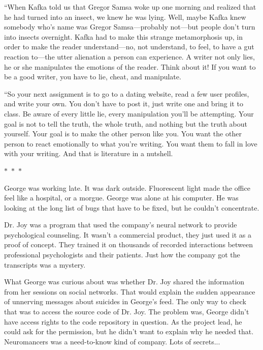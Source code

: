 \documentclass{memoir}
\newcommand{\starbreak}{%
\begin{center}
  $\ast$~$\ast$~$\ast$
\end{center}
}
\begin{document}
``When Kafka told us that Gregor Samsa woke up one morning and realized that he had turned into an insect, we knew he was lying. Well, maybe Kafka knew somebody who's name was Gregor Samsa---probably not---but people don't turn into insects overnight. Kafka had to make this strange metamorphosis up, in order to make the reader understand---no, not understand, to feel, to have a gut reaction to---the utter alienation a person can experience. A writer not only lies, he or she manipulates the emotions of the reader. Think about it! If you want to be a good writer, you have to lie, cheat, and manipulate.

``So your next assignment is to go to a dating website, read a few user profiles, and write your own. You don't have to post it, just write one and bring it to class. Be aware of every little lie, every manipulation you'll be attempting. Your goal is not to tell the truth, the whole truth, and nothing but the truth about yourself. Your goal is to make the other person like you. You want the other person to react emotionally to what you're writing. You want them to fall in love with your writing. And that is literature in a nutshell. 

\starbreak

George was working late. It was dark outside. Fluorescent light made the office feel like a hospital, or a morgue. George was alone at his computer. He was looking at the long list of bugs that have to be fixed, but he couldn't concentrate. 

Dr. Joy was a program that used the company's neural network to provide psychological counseling. It wasn't a commercial product, they just used it as a proof of concept. They trained it on thousands of recorded interactions between professional psychologists and their patients. Just how the company got the transcripts was a mystery. 

What George was curious about was whether Dr. Joy shared the information from her sessions on social networks. That would explain the sudden appearance of unnerving messages about suicides in George's feed. The only way to check that was to access the source code of Dr. Joy. The problem was, George didn't have access rights to the code repository in question. As the project lead, he could ask for the permission, but he didn't want to explain why he needed that. Neuromancers was a need-to-know kind of company. Lots of secrets... 
\end{document}
